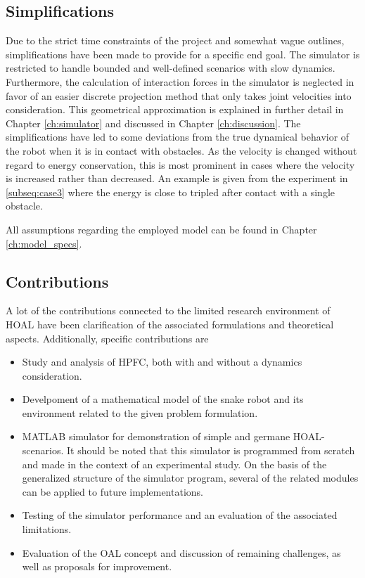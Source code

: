 \subsection{Simplifications}
Due to the strict time constraints of the project and somewhat vague outlines, simplifications have been made to provide for a specific end goal. The simulator is restricted to handle bounded and well-defined scenarios with slow dynamics. Furthermore, the calculation of interaction forces in the simulator is neglected in favor of an easier discrete projection method that only takes joint velocities into consideration. This geometrical approximation is explained in further detail in Chapter \ref{ch:simulator} and discussed in Chapter \ref{ch:discussion}. The simplifications have led to some deviations from the true dynamical behavior of the robot when it is in contact with obstacles. As the velocity is changed without regard to energy conservation, this is most prominent in cases where the velocity is increased rather than decreased. An example is given from the experiment in \ref{subseq:case3} where the energy is close to tripled after contact with a single obstacle.

All assumptions regarding the employed model can be found in Chapter \ref{ch:model_specs}.

\subsection{Contributions}
A lot of the contributions connected to the limited research environment of HOAL have been clarification of the associated formulations and theoretical aspects.
Additionally, specific contributions are 

\begin{itemize}
    \item Study and analysis of HPFC, both with and without a dynamics consideration.
    \item Develpoment of a mathematical model of the snake robot and its environment           related to the given problem formulation.
    \item MATLAB simulator for demonstration of simple and germane HOAL-scenarios.
        It should be noted that this simulator is programmed from scratch and made in the context of an experimental study.
        On the basis of the generalized structure of the simulator program, several of the related modules can be applied to future implementations.
    \item Testing of the simulator performance and an evaluation of the associated             limitations.
    \item Evaluation of the OAL concept and discussion of remaining challenges, as well     as proposals for improvement.
\end{itemize}

